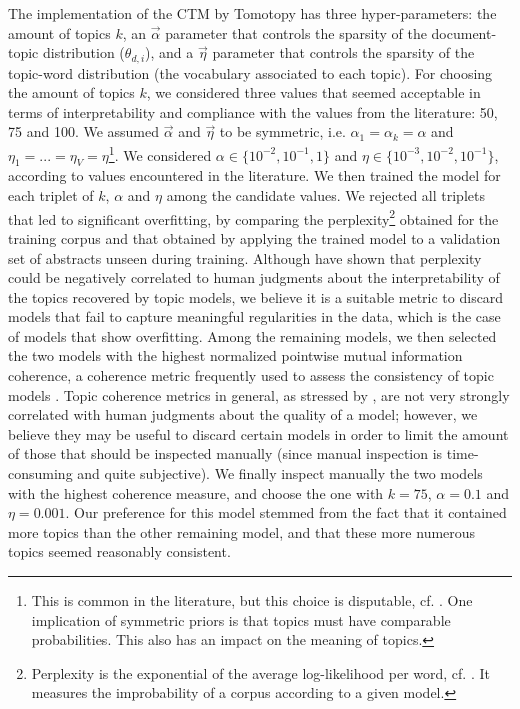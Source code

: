 \documentclass[smallextended]{svjour3}
\begin{document}
The implementation of the CTM by Tomotopy \citep{tomotopy} has three hyper-parameters: the amount of topics $k$, an $\vec{\alpha}$ parameter that controls the sparsity of the document-topic distribution ($\theta_{d,i}$), and a $\vec{\eta}$ parameter that controls the sparsity of the topic-word distribution (the vocabulary associated to each topic).
For choosing the amount of topics $k$, we considered three values that seemed acceptable in terms of interpretability and compliance with the values from the literature: 50, 75 and 100.
We assumed $\vec{\alpha}$ and $\vec{\eta}$ to be symmetric, i.e. $\alpha_1 = \alpha_k = \alpha$ and $\eta_1 = ... = \eta_V = \eta$\footnote{This is common in the literature, but this choice is disputable, cf. \citealt{Wallach2009}. One implication of symmetric priors is that topics must have comparable probabilities. This also has an impact on the meaning of topics.}. We considered  $\alpha \in \{10^{-2},10^{-1},1\}$ and $\eta \in \{10^{-3},10^{-2},10^{-1}\}$, according to values encountered in the literature.
We then trained the model for each triplet of $k$, $\alpha$ and $\eta$ among the candidate values. We rejected all triplets that led to significant overfitting, by comparing the perplexity\footnote{Perplexity is the exponential of the average log-likelihood per word, cf. \citealt{Blei2003}. It measures the improbability of a corpus according to a given model.} obtained for the training corpus and that obtained by applying the trained model to a validation set of abstracts unseen during training.
Although \citet{Chang2009} have shown that perplexity could be negatively correlated to human judgments about the interpretability of the topics recovered by topic models, we believe it is a suitable metric to discard models that fail to capture meaningful regularities in the data, which is the case of models that show overfitting. Among the remaining models, we then selected the two models with the highest normalized pointwise mutual information coherence, a coherence metric frequently used to assess the consistency of topic models \citep{hoyle2021is}. Topic coherence metrics in general, as stressed by \citeauthor{hoyle2021is}, are not very strongly correlated with human judgments about the quality of a model; however, we believe they may be useful to discard certain models in order to limit the amount of those that should be inspected manually (since manual inspection is time-consuming and quite subjective). We finally inspect manually the two models with the highest coherence measure, and choose the one with $k=75$, $\alpha=0.1$ and $\eta=0.001$. Our preference for this model stemmed from the fact that it contained more topics than the other remaining model, and that these more numerous topics seemed reasonably consistent.
\end{document}

